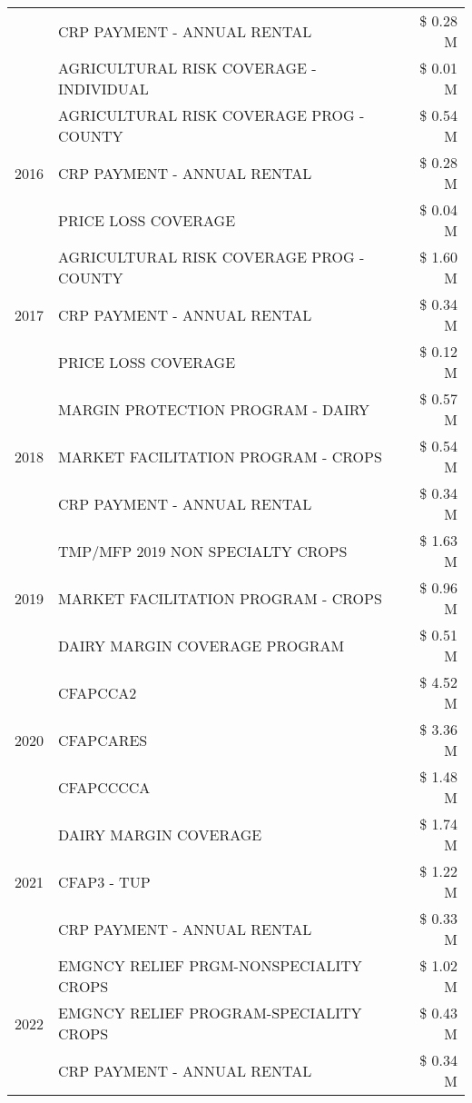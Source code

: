 \begin{tabular}{llr}
 & CRP PAYMENT - ANNUAL RENTAL & \$ 0.28 M \\
 & AGRICULTURAL RISK COVERAGE - INDIVIDUAL & \$ 0.01 M \\
\cline{1-3}
\multirow[t]{3}{*}{2016} & AGRICULTURAL RISK COVERAGE PROG - COUNTY & \$ 0.54 M \\
 & CRP PAYMENT - ANNUAL RENTAL & \$ 0.28 M \\
 & PRICE LOSS COVERAGE & \$ 0.04 M \\
\cline{1-3}
\multirow[t]{3}{*}{2017} & AGRICULTURAL RISK COVERAGE PROG - COUNTY & \$ 1.60 M \\
 & CRP PAYMENT - ANNUAL RENTAL & \$ 0.34 M \\
 & PRICE LOSS COVERAGE & \$ 0.12 M \\
\cline{1-3}
\multirow[t]{3}{*}{2018} & MARGIN PROTECTION PROGRAM - DAIRY & \$ 0.57 M \\
 & MARKET FACILITATION PROGRAM - CROPS & \$ 0.54 M \\
 & CRP PAYMENT - ANNUAL RENTAL & \$ 0.34 M \\
\cline{1-3}
\multirow[t]{3}{*}{2019} & TMP/MFP 2019 NON SPECIALTY CROPS & \$ 1.63 M \\
 & MARKET FACILITATION PROGRAM - CROPS & \$ 0.96 M \\
 & DAIRY MARGIN COVERAGE PROGRAM & \$ 0.51 M \\
\cline{1-3}
\multirow[t]{3}{*}{2020} & CFAPCCA2 & \$ 4.52 M \\
 & CFAPCARES & \$ 3.36 M \\
 & CFAPCCCCA & \$ 1.48 M \\
\cline{1-3}
\multirow[t]{3}{*}{2021} & DAIRY MARGIN COVERAGE & \$ 1.74 M \\
 & CFAP3 - TUP & \$ 1.22 M \\
 & CRP PAYMENT - ANNUAL RENTAL & \$ 0.33 M \\
\cline{1-3}
\multirow[t]{3}{*}{2022} & EMGNCY RELIEF PRGM-NONSPECIALITY CROPS & \$ 1.02 M \\
 & EMGNCY RELIEF PROGRAM-SPECIALITY CROPS & \$ 0.43 M \\
 & CRP PAYMENT - ANNUAL RENTAL & \$ 0.34 M \\
\cline{1-3}
\bottomrule
\end{tabular}
